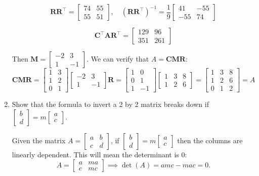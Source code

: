 \documentclass{scrartcl}
\begin{document}
\begin{enumerate}
$$\mathbf{RR}^\top = \begin{bmatrix}
	74 & 55 \\ 55 & 51
\end{bmatrix}, \quad (\mathbf{RR}^\top)^{-1} = \frac{1}{9}\begin{bmatrix}
	41 & -55 \\ -55 & 74
\end{bmatrix}$$

$$\mathbf{C}^\top \mathbf{AR}^\top = \begin{bmatrix}
	129 & 96 \\ 351 & 261
\end{bmatrix}$$

Then $\mathbf{M} = \begin{bmatrix}
	-2 & 3 \\ 1 & - 1
\end{bmatrix}$. We can verify that $A = \mathbf{CMR}$:
$$\mathbf{CMR} = \begin{bmatrix}
	1 & 3 \\ 1 & 2 \\ 0 & 1
\end{bmatrix}\begin{bmatrix}
	-2 & 3 \\ 1 & -1
\end{bmatrix} \mathbf{R} = \begin{bmatrix}
	1 & 0 \\ 0 & 1 \\ 1 & -1
\end{bmatrix}\begin{bmatrix}
	1 & 3 & 8 \\ 1 & 2 & 6
\end{bmatrix} = \begin{bmatrix}
	1 & 3 & 8 \\ 1 & 2 & 6 \\ 0 & 1 & 2
\end{bmatrix} = A$$

\item Show that the formula to invert a 2 by 2 matrix breaks down if $\begin{bmatrix}
	b \\ d
\end{bmatrix} = m \begin{bmatrix}
	a \\ c
\end{bmatrix}$.

Given the matrix $A = \begin{bmatrix}
	a & b \\ c & d
\end{bmatrix}$, if $\begin{bmatrix}
	b \\ d
\end{bmatrix} = m \begin{bmatrix}
	a \\ c
\end{bmatrix}$ then the columns are linearly dependent. This will mean the determinant is 0:
$$A = \begin{bmatrix}
	a & ma \\ c & mc
\end{bmatrix} \implies \det(A) = amc - mac = 0.$$


\end{enumerate}
\end{document}
